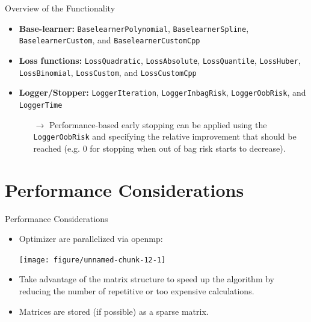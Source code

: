 \documentclass[10pt]{beamer}\usepackage[]{graphicx}\usepackage[]{color}
\newenvironment{knitrout}{}{} %
\begin{document}
\begin{frame}{Overview of the Functionality}

\begin{itemize}

  \item
    \textbf{Base-learner:} \texttt{BaselearnerPolynomial}, \texttt{BaselearnerSpline}, \texttt{BaselearnerCustom}, and \texttt{BaselearnerCustomCpp}

  \item
    \textbf{Loss functions:} \texttt{LossQuadratic}, \texttt{LossAbsolute}, \texttt{LossQuantile}, \texttt{LossHuber}, \texttt{LossBinomial}, \texttt{LossCustom}, and \texttt{LossCustomCpp}

  \item
    \textbf{Logger/Stopper:} \texttt{LoggerIteration}, \texttt{LoggerInbagRisk}, \texttt{LoggerOobRisk}, and \texttt{LoggerTime} \\
    \begin{itemize}
      \item[$\rightarrow$]
        Performance-based early stopping can be applied using the \texttt{LoggerOobRisk} and specifying the relative improvement that should be reached (e.g. 0 for stopping when out of bag risk starts to decrease).
    \end{itemize}

\end{itemize}

\end{frame}

\section{Performance Considerations}

\begin{frame}{Performance Considerations}


\begin{itemize}

  \item
    Optimizer are parallelized via openmp:\vspace{0.3cm}

\begin{knitrout}
\color{fgcolor}

{\centering \texttt{[image: figure/unnamed-chunk-12-1]} 

}



\end{knitrout}

  \item
    Take advantage of the matrix structure to speed up the algorithm by reducing the number of repetitive or too expensive calculations.

  \item
    Matrices are stored (if possible) as a sparse matrix.

\end{itemize}

\end{frame}
\end{document}
